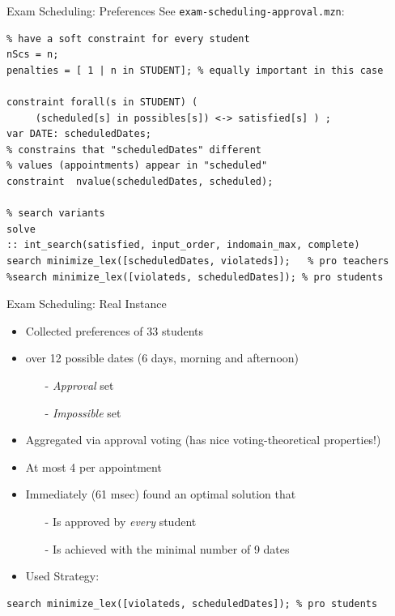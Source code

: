 \documentclass[handout,10pt,xcolor={dvipsnames},fleqn]{beamer}
\begin{document}
\begin{frame}[fragile]{Exam Scheduling: Preferences}
See \texttt{exam-scheduling-approval.mzn}:
\begin{lstlisting}
% have a soft constraint for every student
nScs = n;
penalties = [ 1 | n in STUDENT]; % equally important in this case 

constraint forall(s in STUDENT) ( 
     (scheduled[s] in possibles[s]) <-> satisfied[s] ) ;
var DATE: scheduledDates;
% constrains that "scheduledDates" different 
% values (appointments) appear in "scheduled"
constraint  nvalue(scheduledDates, scheduled);

% search variants 
solve 
:: int_search(satisfied, input_order, indomain_max, complete)
search minimize_lex([scheduledDates, violateds]);   % pro teachers
%search minimize_lex([violateds, scheduledDates]); % pro students
\end{lstlisting}
\end{frame}


\begin{frame}[fragile]{Exam Scheduling: Real Instance}

\begin{itemize}
\item Collected preferences of 33 students
\item over 12 possible dates (6 days, morning and afternoon)
\begin{itemize}
\item[-] \emph{Approval} set 
\item[-] \emph{Impossible} set 
\end{itemize}

\vspace*{2ex}

\item Aggregated via \alert{approval voting} (has nice voting-theoretical properties!)
\item At most 4 per appointment

\item Immediately (61 msec) found an optimal solution that
\begin{itemize}
\item[-] Is approved by \emph{every} student
\item[-] Is achieved with the minimal number of 9 dates 
\end{itemize}
\item Used Strategy:
\end{itemize}
\begin{lstlisting}
search minimize_lex([violateds, scheduledDates]); % pro students
\end{lstlisting}
\end{frame}
\end{document}
